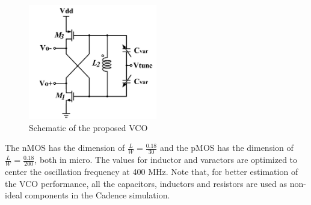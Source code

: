 \begin{figure}[h]
   \centering
    \includegraphics[width=0.50\textwidth]{figures/VCO.png}
    \caption{Schematic of the proposed VCO}
    \label{fig:vco}
\end{figure}


The nMOS has the dimension of $\frac{L}{W}=\frac{0.18}{30}$ and the pMOS has the dimension of $\frac{L}{W}=\frac{0.18}{200}$, both in micro. The values for inductor and varactors are optimized to center the oscillation frequency at 400 MHz. Note that, for better estimation of the VCO performance, all the capacitors, inductors and resistors are used as non-ideal components in the Cadence simulation. 

